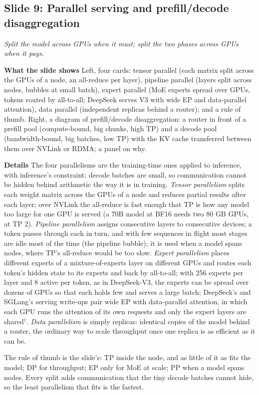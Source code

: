 \documentclass[11pt,letterpaper]{article}
\newcommand{\slide}[3]{%
  \subsection[Slide #1: #2]{Slide #1: #2}%
  {\color{muted}\itshape #3\par}\medskip}
\newcommand{\para}[1]{\medskip\noindent\textbf{#1}\quad}
\begin{document}
\slide{9}{Parallel serving and prefill/decode disaggregation}{Split the model across GPUs when it must; split the two phases across GPUs when it pays.}

\para{What the slide shows} Left, four cards: tensor parallel (each matrix split across the GPUs of a node, an all-reduce per layer), pipeline parallel (layers split across nodes, bubbles at small batch), expert parallel (MoE experts spread over GPUs, tokens routed by all-to-all; DeepSeek serves V3 with wide EP and data-parallel attention), data parallel (independent replicas behind a router); and a rule of thumb. Right, a diagram of prefill/decode disaggregation: a router in front of a prefill pool (compute-bound, big chunks, high TP) and a decode pool (bandwidth-bound, big batches, low TP) with the KV cache transferred between them over NVLink or RDMA; a panel on why.

\para{Details} The four parallelisms are the training-time ones applied to inference, with inference's constraint: decode batches are small, so communication cannot be hidden behind arithmetic the way it is in training. \emph{Tensor parallelism} splits each weight matrix across the GPUs of a node and reduces partial results after each layer; over NVLink the all-reduce is fast enough that TP is how any model too large for one GPU is served (a 70B model at BF16 needs two 80 GB GPUs, at TP 2). \emph{Pipeline parallelism} assigns consecutive layers to consecutive devices; a token passes through each in turn, and with few sequences in flight most stages are idle most of the time (the pipeline bubble); it is used when a model spans nodes, where TP's all-reduce would be too slow. \emph{Expert parallelism} places different experts of a mixture-of-experts layer on different GPUs and routes each token's hidden state to its experts and back by all-to-all; with 256 experts per layer and 8 active per token, as in DeepSeek-V3, the experts can be spread over dozens of GPUs so that each holds few and serves a large batch; DeepSeek's and SGLang's serving write-ups pair wide EP with data-parallel attention, in which each GPU runs the attention of its own requests and only the expert layers are shared$^\dagger$. \emph{Data parallelism} is simply replicas: identical copies of the model behind a router, the ordinary way to scale throughput once one replica is as efficient as it can be.

The rule of thumb is the slide's: TP inside the node, and as little of it as fits the model; DP for throughput; EP only for MoE at scale; PP when a model spans nodes. Every split adds communication that the tiny decode batches cannot hide, so the least parallelism that fits is the fastest.
\end{document}
